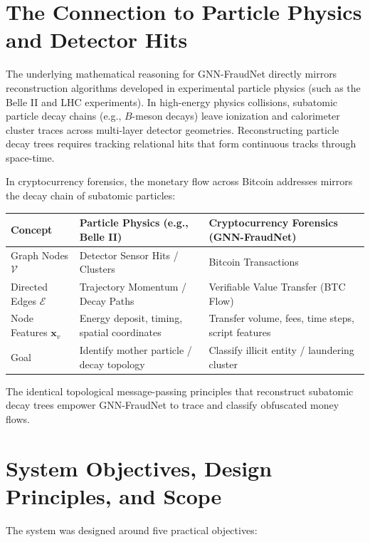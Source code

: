 \documentclass[11pt,a4paper]{report}
\begin{document}
\section{The Connection to Particle Physics and Detector Hits}
The underlying mathematical reasoning for GNN-FraudNet directly mirrors reconstruction algorithms developed in experimental particle physics (such as the Belle II and LHC experiments). In high-energy physics collisions, subatomic particle decay chains (e.g., $B$-meson decays) leave ionization and calorimeter cluster traces across multi-layer detector geometries. Reconstructing particle decay trees requires tracking relational hits that form continuous tracks through space-time.

In cryptocurrency forensics, the monetary flow across Bitcoin addresses mirrors the decay chain of subatomic particles:
\begin{center}
\begin{tabular}{lll}
\toprule
\textbf{Concept} & \textbf{Particle Physics (e.g., Belle II)} & \textbf{Cryptocurrency Forensics (GNN-FraudNet)} \\
\midrule
Graph Nodes $\mathcal{V}$ & Detector Sensor Hits / Clusters & Bitcoin Transactions \\
Directed Edges $\mathcal{E}$ & Trajectory Momentum / Decay Paths & Verifiable Value Transfer (BTC Flow) \\
Node Features $\mathbf{x}_v$ & Energy deposit, timing, spatial coordinates & Transfer volume, fees, time steps, script features \\
Goal & Identify mother particle / decay topology & Classify illicit entity / laundering cluster \\
\bottomrule
\end{tabular}
\end{center}
The identical topological message-passing principles that reconstruct subatomic decay trees empower GNN-FraudNet to trace and classify obfuscated money flows.


\section{System Objectives, Design Principles, and Scope}

The system was designed around five practical objectives:
\end{document}

